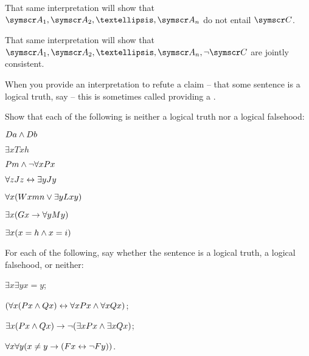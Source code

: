 \begin{earg}
{	That same interpretation will show that $\meta{A}_1, \meta{A}_2, …, \meta{A}_n$ do not entail $\meta{C}$.
	
	That same interpretation will show that $\meta{A}_1, \meta{A}_2, …, \meta{A}_n, \enot \meta{C}$ are jointly consistent.}
When you provide an interpretation to refute a claim – that some sentence is a logical truth, say – this is sometimes called providing a .


\practiceproblems



\problempart
\label{pr.Contingent}
Show that each of the following is neither a logical truth nor a logical falsehood:
\begin{earg}
\item  $Da \wedge Db$
\item  $\exists x Txh$
\item  $Pm \wedge \neg\forall x Px$
\item $\forall z Jz \leftrightarrow \exists y Jy$
\item $\forall x (Wxmn \vee \exists yLxy)$
\item $\exists x (Gx \rightarrow \forall y My)$
\item $\exists x (x = h \wedge x = i)$
\end{earg}

\problempart For each of the following, say whether the sentence is a logical truth, a logical falsehood, or neither: \begin{earg}
	\item $\exists x \exists y x=y$;
	\item $(\forall x (Px\wedge Qx)\leftrightarrow \forall x Px\wedge \forall x Qx)$;
	\item $\exists x (Px\wedge Qx) \rightarrow \neg (\exists x Px\wedge \exists x Qx)$;
	\item $\forall x \forall y (x \neq y \rightarrow (Fx \leftrightarrow \neg Fy))$.
\end{earg}



\end{earg}
